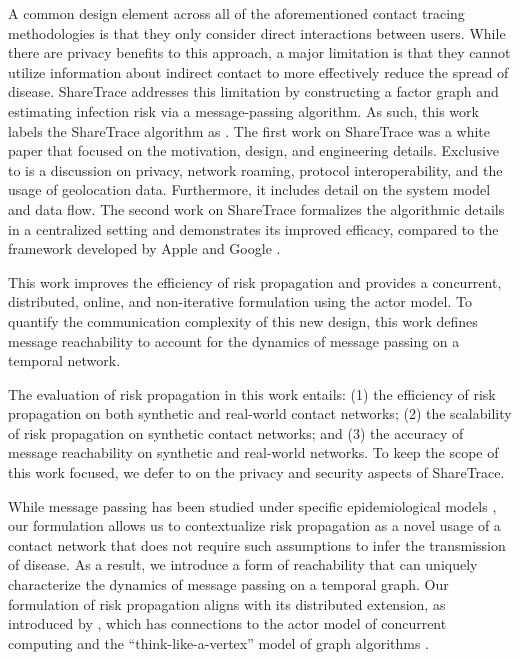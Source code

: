 A common design element across all of the aforementioned contact tracing methodologies is that they only consider direct interactions between users. While there are privacy benefits to this approach, a major limitation is that they cannot utilize information about indirect contact to more effectively reduce the spread of disease. ShareTrace addresses this limitation by constructing a factor graph and estimating infection risk via a message-passing algorithm. As such, this work labels the ShareTrace algorithm as . The first work on ShareTrace was a white paper that focused on the motivation, design, and engineering details. Exclusive to \cite{Ayday2020} is a discussion on privacy, network roaming, protocol interoperability, and the usage of geolocation data. Furthermore, it includes detail on the system model and data flow. The second work on ShareTrace \cite{Ayday2021} formalizes the algorithmic details in a centralized setting and demonstrates its improved efficacy, compared to the framework developed by Apple and Google \cite{AppleGoogle}.

This work improves the efficiency of risk propagation and provides a concurrent, distributed, online, and non-iterative formulation using the actor model. To quantify the communication complexity of this new design, this work defines message reachability to account for the dynamics of message passing on a temporal network. 

The evaluation of risk propagation in this work entails: (1) the efficiency of risk propagation on both synthetic and real-world contact networks; (2) the scalability of risk propagation on synthetic contact networks; and (3) the accuracy of message reachability on synthetic and real-world networks. To keep the scope of this work focused, we defer to \cite{Ayday2021} on the privacy and security aspects of ShareTrace.

While message passing has been studied under specific epidemiological models \cite{Karrer2010, Li2021}, our formulation allows us to contextualize risk propagation as a novel usage of a contact network that does not require such assumptions to infer the transmission of disease. As a result, we introduce a form of reachability that can uniquely characterize the dynamics of message passing on a temporal graph. Our formulation of risk propagation aligns with its distributed extension, as introduced by \cite{Ayday2021}, which has connections to the actor model of concurrent computing \cite{Baker1977, Agha1986} and the ``think-like-a-vertex'' model of graph algorithms \cite{McCune2015}.